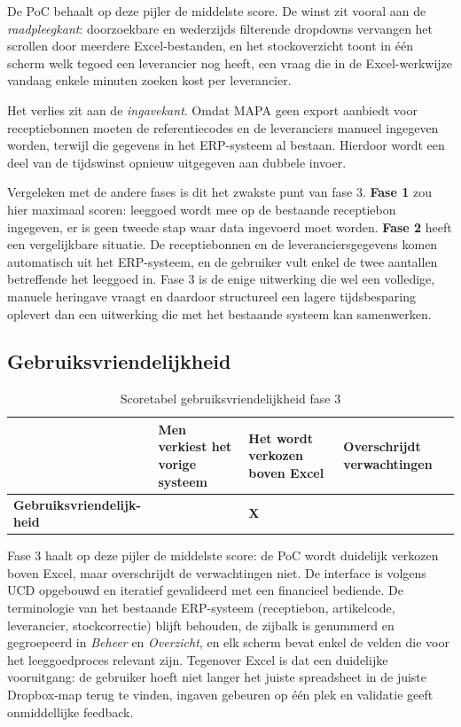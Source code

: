 De PoC behaalt op deze pijler de middelste score. De winst zit vooral aan de \emph{raadpleegkant}: doorzoekbare en wederzijds filterende dropdowns vervangen het scrollen door meerdere Excel-bestanden, en het stockoverzicht toont in één scherm welk tegoed een leverancier nog heeft, een vraag die in de Excel-werkwijze vandaag enkele minuten zoeken kost per leverancier.

Het verlies zit aan de \emph{ingavekant}. Omdat MAPA geen export aanbiedt voor receptiebonnen moeten de referentiecodes en de leveranciers manueel ingegeven worden, terwijl die gegevens in het ERP-systeem al bestaan. Hierdoor wordt een deel van de tijdswinst opnieuw uitgegeven aan dubbele invoer.

Vergeleken met de andere fases is dit het zwakste punt van fase 3. \textbf{Fase 1} zou hier maximaal scoren: leeggoed wordt mee op de bestaande receptiebon ingegeven, er is geen tweede stap waar data ingevoerd moet worden. \textbf{Fase 2} heeft een vergelijkbare situatie. De receptiebonnen en de leveranciersgegevens komen automatisch uit het ERP-systeem, en de gebruiker vult enkel de twee aantallen betreffende het leeggoed in. Fase 3 is de enige uitwerking die wel een volledige, manuele heringave vraagt en daardoor structureel een lagere tijdsbesparing oplevert dan een uitwerking die met het bestaande systeem kan samenwerken.

\subsection{Gebruiksvriendelijkheid}

\begin{table}[H]
    \centering
    \begin{tabular}{|p{4cm}|p{3cm}|p{3cm}|p{3cm}|}
        \hline
        & \textbf{Men verkiest het vorige systeem} & \textbf{Het wordt verkozen boven Excel} & \textbf{Overschrijdt verwachtingen} \\
        \hline
        \textbf{Gebruiksvriendelijk-heid} &  & \textbf{X} &  \\
        \hline
    \end{tabular}
    \caption[Scoretabel gebruiksvriendelijkheid fase 3]{\label{tab:tbgeb_f3}Scoretabel gebruiksvriendelijkheid fase 3}
\end{table}

Fase 3 haalt op deze pijler de middelste score: de PoC wordt duidelijk verkozen boven Excel, maar overschrijdt de verwachtingen niet. De interface is volgens UCD opgebouwd en iteratief gevalideerd met een financieel bediende. De terminologie van het bestaande ERP-systeem (receptiebon, artikelcode, leverancier, stockcorrectie) blijft behouden, de zijbalk is genummerd en gegroepeerd in \textit{Beheer} en \textit{Overzicht}, en elk scherm bevat enkel de velden die voor het leeggoedproces relevant zijn. Tegenover Excel is dat een duidelijke vooruitgang: de gebruiker hoeft niet langer het juiste spreadsheet in de juiste Dropbox-map terug te vinden, ingaven gebeuren op één plek en validatie geeft onmiddellijke feedback.

